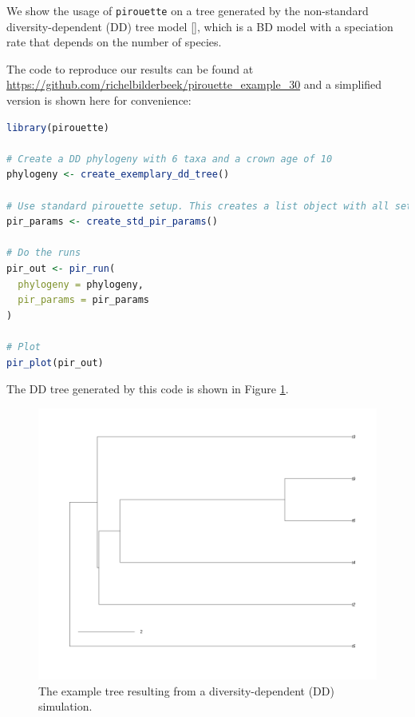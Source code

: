 We show the usage of \verb;pirouette; on a tree generated 
by the non-standard diversity-dependent (DD) tree 
model [\citep{DDD, etienne2012diversity}],
which is a BD model with a speciation rate that depends on the number of species. 

The code to reproduce our results can be found at  
\url{https://github.com/richelbilderbeek/pirouette_example_30}
and a simplified version is shown here for convenience:

\begin{lstlisting}[language=R]
library(pirouette)

# Create a DD phylogeny with 6 taxa and a crown age of 10
phylogeny <- create_exemplary_dd_tree()

# Use standard pirouette setup. This creates a list object with all settings for generating the alignment, the inference using BEAST2,  the twinning parameters to generate the twin tree and infer it using BEAST2, and the error measure  
pir_params <- create_std_pir_params()

# Do the runs
pir_out <- pir_run(
  phylogeny = phylogeny,
  pir_params = pir_params
)

# Plot
pir_plot(pir_out)
\end{lstlisting}

The DD tree generated by this code is shown in Figure \ref{fig:dd_tree}. 

\begin{figure}[H]
  \includegraphics[width=\textwidth]{pirouette_example_30/example_30_314/true_tree.png}
  \caption{
    The example tree resulting from a diversity-dependent (DD) simulation.
  }
  \label{fig:dd_tree}
\end{figure}


